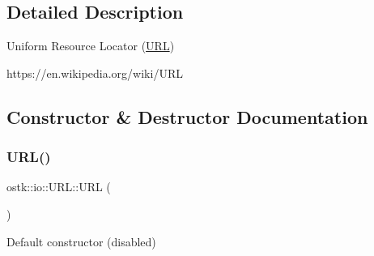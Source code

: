 \subsection{Detailed Description}
Uniform Resource Locator (\hyperlink{classostk_1_1io_1_1_u_r_l}{U\+RL}) 

https\+://en.wikipedia.\+org/wiki/\+U\+RL 

\subsection{Constructor \& Destructor Documentation}
\mbox{\label{classostk_1_1io_1_1_u_r_l_a2537e046cef4ac966cc295abb81279c2}} 
\subsubsection{\texorpdfstring{U\+R\+L()}{URL()}\hspace{0.1cm}{\footnotesize\ttfamily [1/2]}}
{\footnotesize\ttfamily ostk\+::io\+::\+U\+R\+L\+::\+U\+RL (\begin{DoxyParamCaption}{ }\end{DoxyParamCaption})\hspace{0.3cm}{\ttfamily [delete]}}



Default constructor (disabled) 

\mbox{\label{classostk_1_1io_1_1_u_r_l_a5a24386372bb8c71e9314c003058b22f}} 
